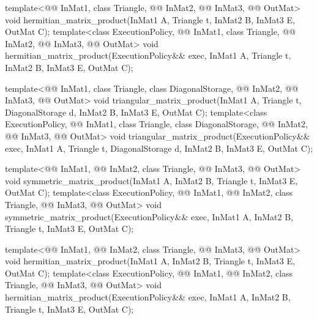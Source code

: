 \begin{codeblock}
{  template<@@ InMat1, class Triangle, @@ InMat2, @@ InMat3,
           @@ OutMat>
    void hermitian_matrix_product(InMat1 A, Triangle t, InMat2 B, InMat3 E, OutMat C);
  template<class ExecutionPolicy,
           @@ InMat1, class Triangle, @@ InMat2, @@ InMat3,
           @@ OutMat>
    void hermitian_matrix_product(ExecutionPolicy&& exec,
                                  InMat1 A, Triangle t, InMat2 B, InMat3 E, OutMat C);

  template<@@ InMat1, class Triangle, class DiagonalStorage,
           @@ InMat2, @@ InMat3, @@ OutMat>
    void triangular_matrix_product(InMat1 A, Triangle t, DiagonalStorage d, InMat2 B, InMat3 E,
                                   OutMat C);
  template<class ExecutionPolicy,
           @@ InMat1, class Triangle, class DiagonalStorage,
           @@ InMat2, @@ InMat3, @@ OutMat>
    void triangular_matrix_product(ExecutionPolicy&& exec,
                                   InMat1 A, Triangle t, DiagonalStorage d, InMat2 B, InMat3 E,
                                   OutMat C);

  template<@@ InMat1, @@ InMat2, class Triangle, @@ InMat3,
           @@ OutMat>
    void symmetric_matrix_product(InMat1 A, InMat2 B, Triangle t, InMat3 E, OutMat C);
  template<class ExecutionPolicy,
           @@ InMat1, @@ InMat2, class Triangle, @@ InMat3,
           @@ OutMat>
    void symmetric_matrix_product(ExecutionPolicy&& exec,
                                  InMat1 A, InMat2 B, Triangle t, InMat3 E, OutMat C);

  template<@@ InMat1, @@ InMat2, class Triangle, @@ InMat3,
           @@ OutMat>
    void hermitian_matrix_product(InMat1 A, InMat2 B, Triangle t, InMat3 E, OutMat C);
  template<class ExecutionPolicy,
           @@ InMat1, @@ InMat2, class Triangle, @@ InMat3,
           @@ OutMat>
    void hermitian_matrix_product(ExecutionPolicy&& exec,
                                  InMat1 A, InMat2 B, Triangle t, InMat3 E, OutMat C);

}
\end{codeblock}
